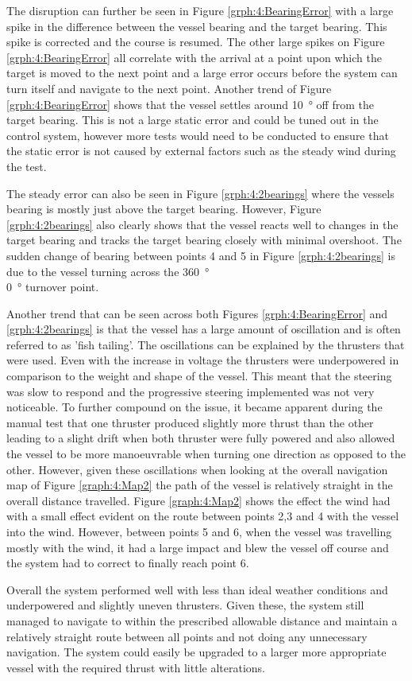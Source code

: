 The disruption can further be seen in Figure \ref{grph:4:BearingError} with a large spike in the difference between the vessel bearing and the target bearing. This spike is corrected and the course is resumed. The other large spikes on Figure \ref{grph:4:BearingError} all correlate with the arrival at a point upon which the target is moved to the next point and a large error occurs before the system can turn itself and navigate to the next point. Another trend of Figure \ref{grph:4:BearingError} shows that the vessel settles around \SI{10}{\degree} off from the target bearing. This is not a large static error and could be tuned out in the control system, however more tests would need to be conducted to ensure that the static error is not caused by external factors such as the steady wind during the test. \par
The steady error can also be seen in Figure \ref{grph:4:2bearings} where the vessels bearing is mostly just above the target bearing. However, Figure \ref{grph:4:2bearings} also clearly shows that the vessel reacts well to changes in the target bearing and tracks the target bearing closely with minimal overshoot. The sudden change of bearing between points 4 and 5 in Figure \ref{grph:4:2bearings} is due to the vessel turning across the \SI{360}{\degree}\\\SI{0}{\degree} turnover point. \par
Another trend that can be seen across both Figures \ref{grph:4:BearingError} and \ref{grph:4:2bearings} is that the vessel has a large amount of oscillation and is often referred to as 'fish tailing'. The oscillations can be explained by the thrusters that were used. Even with the increase in voltage the thrusters were underpowered in comparison to the weight and shape of the vessel. This meant that the steering was slow to respond and the progressive steering implemented was not very noticeable. To further compound on the issue, it became apparent during the manual test that one thruster produced slightly more thrust than the other leading to a slight drift when both thruster were fully powered and also allowed the vessel to be more manoeuvrable when turning one direction as opposed to the other. However, given these oscillations when looking at the overall navigation map of Figure \ref{graph:4:Map2} the path of the vessel is relatively straight in the overall distance travelled. Figure \ref{graph:4:Map2} shows the effect the wind had with a small effect evident on the route between points 2,3 and 4 with the vessel into the wind. However, between points 5 and 6, when the vessel was travelling mostly with the wind, it had a large impact and blew the vessel off course and the system had to correct to finally reach point 6.\par
Overall the system performed well with less than ideal weather conditions and underpowered and slightly uneven thrusters. Given these, the system still managed to navigate to within the prescribed allowable distance and maintain a relatively straight route between all points and not doing any unnecessary navigation. The system could easily be upgraded to a larger more appropriate vessel with the required thrust with little alterations.

